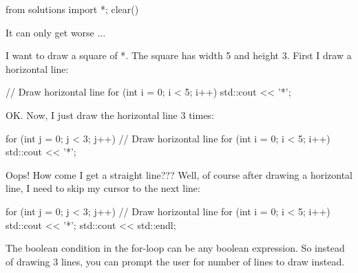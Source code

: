 \begin{python0}
from solutions import *; clear()
\end{python0}

It can only get worse ...

I want to draw a square of *. The square has width 5 and height 3. First
I draw a horizontal line:
\begin{console}
// Draw horizontal line
for (int i = 0; i < 5; i++)
{   
    std::cout << '*';
}
\end{console}

OK. Now, I just draw the horizontal line 3 times:
\begin{console}
for (int j = 0; j < 3; j++)
{   
    // Draw horizontal line
    for (int i = 0; i < 5; i++)
    {   
        std::cout << '*';
    }
}
\end{console}

Oops! How come I get a straight line??? Well, of course after drawing a
horizontal line, I need to skip my cursor to the next line:
\begin{console}
for (int j = 0; j < 3; j++)
{   
    // Draw horizontal line
    for (int i = 0; i < 5; i++)
    {   
        std::cout << '*';
    }
    std::cout << std::endl;
}
\end{console}


The boolean condition in the for-loop can be any boolean expression. So
instead of drawing 3 lines, you can prompt the user for number of lines
to draw instead.



